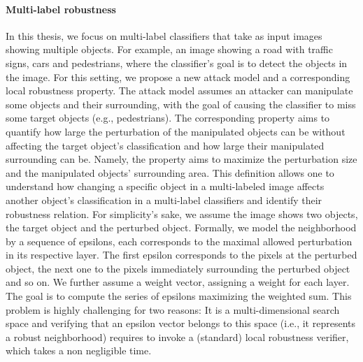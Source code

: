 \paragraph{Multi-label robustness}
In this thesis, we focus on multi-label classifiers that take as input images showing multiple objects. For example, an image showing a road with traffic signs, cars and pedestrians, where the classifier's goal is to detect the objects in the image.
For this setting, we propose a new attack model and a corresponding local robustness property. The attack model assumes an attacker can manipulate some objects and their surrounding, with the goal of causing the classifier to miss some target objects (e.g., pedestrians).
 The corresponding property aims to quantify how large the perturbation of the manipulated objects can be without affecting the target object's classification and how large their manipulated surrounding can be.
  Namely, the property aims to maximize the perturbation size and the manipulated objects' surrounding area.
This definition allows one to understand how changing a specific object in a multi-labeled image affects another object's classification in a multi-label classifiers and identify their robustness relation.
For simplicity's sake, we assume the image shows two objects, the target object and the perturbed object.
Formally, we model the neighborhood by a sequence of epsilons, each corresponds to the maximal allowed perturbation in its respective layer.
The first epsilon corresponds to the pixels at the perturbed object, the next one to the pixels immediately surrounding the perturbed object and so on. %
We further assume a weight vector, assigning a weight for each layer.
The goal is to compute the series of epsilons maximizing the weighted sum.
This problem is highly challenging for two reasons:
It is a multi-dimensional search space and verifying that an epsilon vector belongs to this space (i.e., it represents a robust neighborhood) requires to invoke a (standard) local robustness verifier, which takes a non negligible time.

